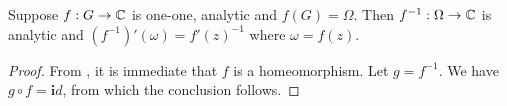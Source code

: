 \begin{corollary}
    Suppose $f: G\to\mathbb{C}$ is one-one, analytic and $f(G) = \Omega$. Then $f^{-1}:\Omega\to\mathbb{C}$ is analytic and $(f^{-1})'(\omega) = f'(z)^{-1}$ where $\omega = f(z)$.
\end{corollary}
\begin{proof}
    From , it is immediate that $f$ is a homeomorphism. Let $g = f^{-1}$. We have $g\circ f = \mathbf id$, from which the conclusion follows.
\end{proof}